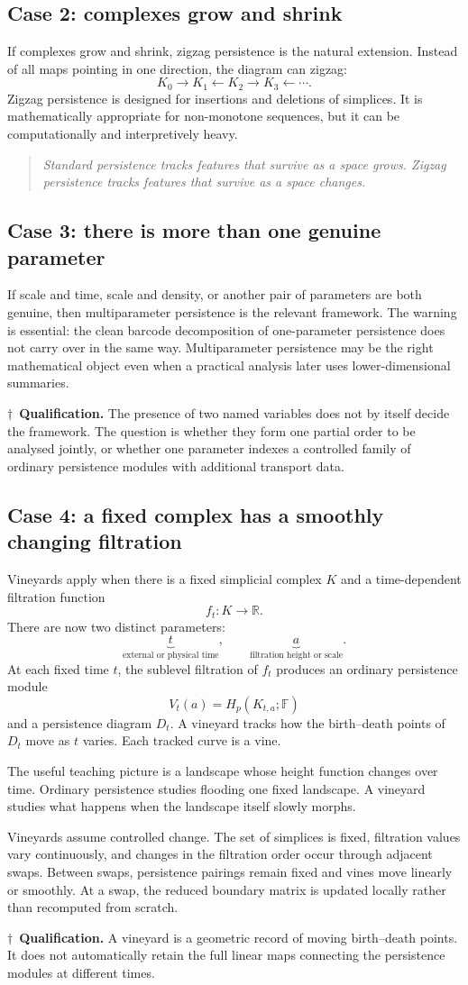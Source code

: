 \documentclass[11pt,a4paper]{article}
\newcommand{\planningbox}[2]{%
\subsection*{#1}
#2
}
\newcommand{\phrase}[1]{%
\begin{quote}
\emph{#1}
\end{quote}
}
\newcommand{\qualification}[1]{%
\par\smallskip
\noindent\textcolor{blue!70!black}{\(\dagger\)\ \textbf{Qualification.}} #1
\par\smallskip
}
\begin{document}
\planningbox{Case 2: complexes grow and shrink}{
If complexes grow and shrink, zigzag persistence is the natural extension.
Instead of all maps pointing in one direction, the diagram can zigzag:
\[
K_0\to K_1 \leftarrow K_2 \to K_3 \leftarrow \cdots.
\]
Zigzag persistence is designed for insertions and deletions of simplices. It is
mathematically appropriate for non-monotone sequences, but it can be
computationally and interpretively heavy.
}

\phrase{Standard persistence tracks features that survive as a space grows.
Zigzag persistence tracks features that survive as a space changes.}

\planningbox{Case 3: there is more than one genuine parameter}{
If scale and time, scale and density, or another pair of parameters are both
genuine, then multiparameter persistence is the relevant framework. The warning
is essential: the clean barcode decomposition of one-parameter persistence does
not carry over in the same way. Multiparameter persistence may be the right
mathematical object even when a practical analysis later uses lower-dimensional
summaries.

\qualification{The presence of two named variables does not by itself decide
the framework. The question is whether they form one partial order to be
analysed jointly, or whether one parameter indexes a controlled family of
ordinary persistence modules with additional transport data.}
}

\planningbox{Case 4: a fixed complex has a smoothly changing filtration}{
Vineyards apply when there is a fixed simplicial complex \(K\) and a
time-dependent filtration function
\[
f_t:K\to\mathbb{R}.
\]
There are now two distinct parameters:
\[
\underbrace{t}_{\text{external or physical time}},
\qquad
\underbrace{a}_{\text{filtration height or scale}}.
\]
At each fixed time \(t\), the sublevel filtration of \(f_t\) produces an
ordinary persistence module
\[
V_t(a)=H_p(K_{t,a};\mathbb F)
\]
and a persistence diagram \(D_t\). A vineyard tracks how the birth--death
points of \(D_t\) move as \(t\) varies. Each tracked curve is a vine.

The useful teaching picture is a landscape whose height function changes over
time. Ordinary persistence studies flooding one fixed landscape. A vineyard
studies what happens when the landscape itself slowly morphs.

Vineyards assume controlled change. The set of simplices is fixed, filtration
values vary continuously, and changes in the filtration order occur through
adjacent swaps. Between swaps, persistence pairings remain fixed and vines move
linearly or smoothly. At a swap, the reduced boundary matrix is updated locally
rather than recomputed from scratch.

\qualification{A vineyard is a geometric record of moving birth--death points.
It does not automatically retain the full linear maps connecting the
persistence modules at different times.}
}
\end{document}

